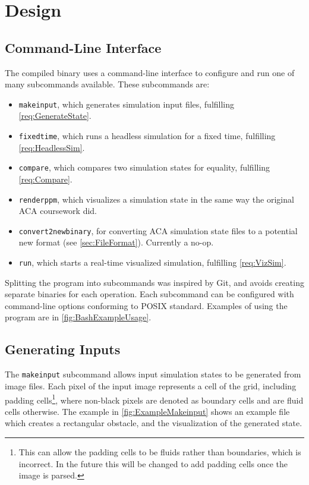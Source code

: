
\chapter{Design}
\label{sec:Design} 

\section{Command-Line Interface}
The compiled binary uses a command-line interface to configure and run one of many subcommands available.
These subcommands are:\label{sec:DesignSubcommands}
\begin{itemize}
    \item \texttt{makeinput}, which generates simulation input files, fulfilling \cref{req:GenerateState}.
    \item \texttt{fixedtime}, which runs a headless simulation for a fixed time, fulfilling \cref{req:HeadlessSim}.
    \item \texttt{compare}, which compares two simulation states for equality, fulfilling \cref{req:Compare}.
    \item \texttt{renderppm}, which visualizes a simulation state in the same way the original ACA coursework did.
    \item \texttt{convert2newbinary}, for converting ACA simulation state files to a potential new format (see \cref{sec:FileFormat}). Currently a no-op.
    \item \texttt{run}, which starts a real-time visualized simulation, fulfilling \cref{req:VizSim}.
\end{itemize}
Splitting the program into subcommands was inspired by Git\cite{tool:Git}, and avoids creating separate binaries for each operation.
Each subcommand can be configured with command-line options conforming to POSIX standard\cite{IEEE2018UtilityConventions}.
Examples of using the program are in \cref{fig:BashExampleUsage}.


\section{Generating Inputs}
The \texttt{makeinput} subcommand allows input simulation states to be generated from image files.
Each pixel of the input image represents a cell of the grid, including padding cells\footnote{This can allow the padding cells to be fluids rather than boundaries, which is incorrect. In the future this will be changed to add padding cells once the image is parsed.}, where non-black pixels are denoted as boundary cells and are fluid cells otherwise.
The example in \cref{fig:ExampleMakeinput} shows an example file which creates a rectangular obstacle, and the visualization of the generated state.


